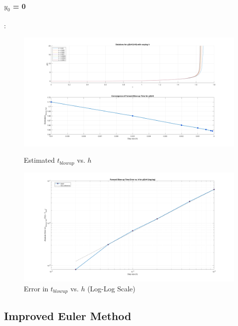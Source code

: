 \documentclass{article}
\begin{document}
\paragraph{$y_0$ = 0} : 
\begin{figure}[htbp]
    \centering
    \begin{minipage}[b]{0.45\textwidth}
        \centering
        \includegraphics[width=\textwidth]{pic/euler_err0-1.png }
        \caption{Estimated $t_{blowup}$ vs. $h$}
        \label{fig:image1}
    \end{minipage}
    \hspace{0.05\textwidth}
    \begin{minipage}[b]{0.45\textwidth}
        \centering
        \includegraphics[width=\textwidth]{pic/euler_err0-2.png}
        \caption{Error in $t_{blowup}$ vs. $h$ (Log-Log Scale) }
        \label{fig:image2}
    \end{minipage}
\end{figure}


\subsection{Improved Euler Method}
\end{document}
